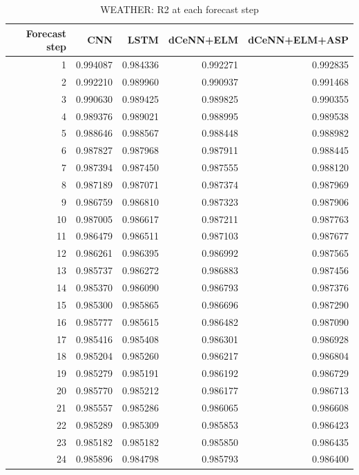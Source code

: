 \begin{table}
\caption{WEATHER: R2 at each forecast step}
\begin{tabular}{rrrrr}
\toprule
Forecast step & CNN & LSTM & dCeNN+ELM & dCeNN+ELM+ASP \\
\midrule
1 & 0.994087 & 0.984336 & 0.992271 & 0.992835 \\
2 & 0.992210 & 0.989960 & 0.990937 & 0.991468 \\
3 & 0.990630 & 0.989425 & 0.989825 & 0.990355 \\
4 & 0.989376 & 0.989021 & 0.988995 & 0.989538 \\
5 & 0.988646 & 0.988567 & 0.988448 & 0.988982 \\
6 & 0.987827 & 0.987968 & 0.987911 & 0.988445 \\
7 & 0.987394 & 0.987450 & 0.987555 & 0.988120 \\
8 & 0.987189 & 0.987071 & 0.987374 & 0.987969 \\
9 & 0.986759 & 0.986810 & 0.987323 & 0.987906 \\
10 & 0.987005 & 0.986617 & 0.987211 & 0.987763 \\
11 & 0.986479 & 0.986511 & 0.987103 & 0.987677 \\
12 & 0.986261 & 0.986395 & 0.986992 & 0.987565 \\
13 & 0.985737 & 0.986272 & 0.986883 & 0.987456 \\
14 & 0.985370 & 0.986090 & 0.986793 & 0.987376 \\
15 & 0.985300 & 0.985865 & 0.986696 & 0.987290 \\
16 & 0.985777 & 0.985615 & 0.986482 & 0.987090 \\
17 & 0.985416 & 0.985408 & 0.986301 & 0.986928 \\
18 & 0.985204 & 0.985260 & 0.986217 & 0.986804 \\
19 & 0.985279 & 0.985191 & 0.986192 & 0.986729 \\
20 & 0.985770 & 0.985212 & 0.986177 & 0.986713 \\
21 & 0.985557 & 0.985286 & 0.986065 & 0.986608 \\
22 & 0.985289 & 0.985309 & 0.985853 & 0.986423 \\
23 & 0.985182 & 0.985182 & 0.985850 & 0.986435 \\
24 & 0.985896 & 0.984798 & 0.985793 & 0.986400 \\
\bottomrule
\end{tabular}
\end{table}
